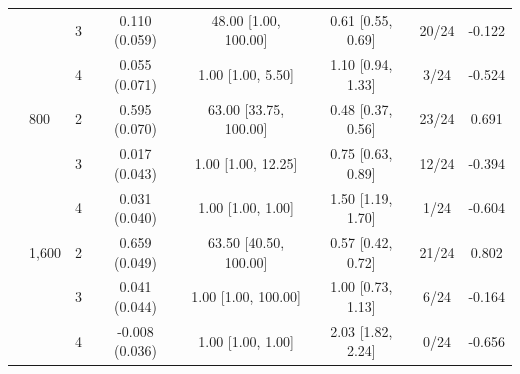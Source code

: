\begin{tabular}{llcccccc}
 &  & 3 & 0.110 (0.059) & 48.00 [1.00, 100.00] & 0.61 [0.55, 0.69] & 20/24 & -0.122 \\
 &  & 4 & 0.055 (0.071) & 1.00 [1.00, 5.50] & 1.10 [0.94, 1.33] & 3/24 & -0.524 \\
 & 800 & 2 & 0.595 (0.070) & 63.00 [33.75, 100.00] & 0.48 [0.37, 0.56] & 23/24 & 0.691 \\
 &  & 3 & 0.017 (0.043) & 1.00 [1.00, 12.25] & 0.75 [0.63, 0.89] & 12/24 & -0.394 \\
 &  & 4 & 0.031 (0.040) & 1.00 [1.00, 1.00] & 1.50 [1.19, 1.70] & 1/24 & -0.604 \\
 & 1,600 & 2 & 0.659 (0.049) & 63.50 [40.50, 100.00] & 0.57 [0.42, 0.72] & 21/24 & 0.802 \\
 &  & 3 & 0.041 (0.044) & 1.00 [1.00, 100.00] & 1.00 [0.73, 1.13] & 6/24 & -0.164 \\
 &  & 4 & -0.008 (0.036) & 1.00 [1.00, 1.00] & 2.03 [1.82, 2.24] & 0/24 & -0.656 \\
\bottomrule
\end{tabular}
